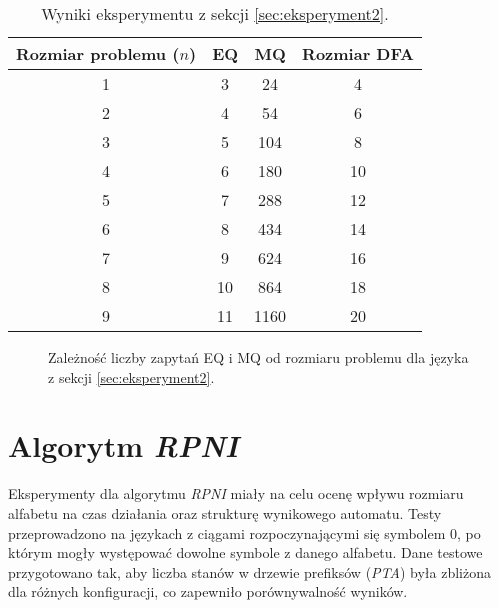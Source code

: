 \begin{table}[ht]
\centering
\caption{Wyniki eksperymentu z sekcji \ref{sec:eksperyment2}.}
\label{tab:lstar_blocks}
\begin{tabular}{|c|c|c|c|}
\hline
Rozmiar problemu (\(n\)) & EQ & MQ & Rozmiar DFA \\ \hline
1                        & 3  & 24  & 4           \\ \hline
2                        & 4  & 54  & 6           \\ \hline
3                        & 5  & 104 & 8           \\ \hline
4                        & 6  & 180 & 10          \\ \hline
5                        & 7  & 288 & 12          \\ \hline
6                        & 8  & 434 & 14          \\ \hline
7                        & 9  & 624 & 16          \\ \hline
8                        & 10 & 864 & 18          \\ \hline
9                        & 11 & 1160 & 20         \\ \hline
\end{tabular}
\end{table}

\begin{figure}[ht]
\centering
{}
\caption{Zależność liczby zapytań EQ i MQ od rozmiaru problemu dla języka z sekcji \ref{sec:eksperyment2}.}
\label{fig:lstar_blocks_mq}
\end{figure}


\section{Algorytm \textit{RPNI}}  
Eksperymenty dla algorytmu \textit{RPNI} miały na celu ocenę wpływu rozmiaru alfabetu na czas działania oraz strukturę wynikowego automatu. Testy przeprowadzono na językach z ciągami rozpoczynającymi się symbolem \( 0 \), po którym mogły występować dowolne symbole z danego alfabetu. Dane testowe przygotowano tak, aby liczba stanów w drzewie prefiksów (\textit{PTA}) była zbliżona dla różnych konfiguracji, co zapewniło porównywalność wyników.  

